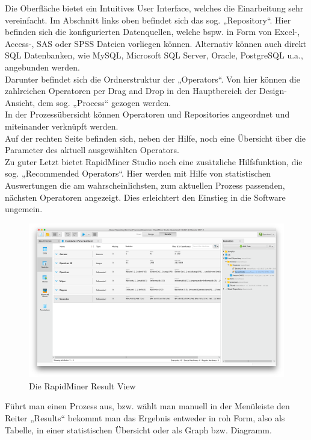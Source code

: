 Die Oberfläche bietet ein Intuitives User Interface, welches die Einarbeitung
sehr vereinfacht. Im Abschnitt links oben befindet sich das sog. „Repository“.
Hier befinden sich die konfigurierten Datenquellen, welche bspw. in Form von
Excel-, Access-, SAS oder SPSS Dateien vorliegen können. Alternativ können auch
direkt SQL Datenbanken, wie MySQL, Microsoft SQL Server, Oracle, PostgreSQL
u.a., angebunden werden. \\
Darunter befindet sich die Ordnerstruktur der „Operators“. Von hier können die
zahlreichen Operatoren per Drag and Drop in den Hauptbereich der Design-Ansicht,
dem sog. „Process“ gezogen werden. \\
In der Prozessübersicht können Operatoren und Repositories angeordnet und
miteinander verknüpft werden. \\
Auf der rechten Seite befinden sich, neben der Hilfe, noch eine Übersicht über
die Parameter des aktuell ausgewählten Operators. \\
Zu guter Letzt bietet RapidMiner Studio noch eine zusätzliche Hilfsfunktion,
die sog. „Recommended Operators“. Hier werden mit Hilfe von statistischen
Auswertungen die am wahrscheinlichsten, zum aktuellen Prozess passenden,
nächsten Operatoren angezeigt. Dies erleichtert den Einstieg in die Software ungemein.

\begin{figure}[htb]
  \includegraphics[width=\textwidth]{gfx/rm3.png}
	\caption{Die RapidMiner Result View}
	\label{fig:software:rm:res}
\end{figure}

Führt man einen Prozess aus, bzw. wählt man manuell in der Menüleiste den Reiter
„Results“ bekommt man das Ergebnis entweder in roh Form, also als Tabelle, in
einer statistischen Übersicht oder als Graph bzw. Diagramm.


